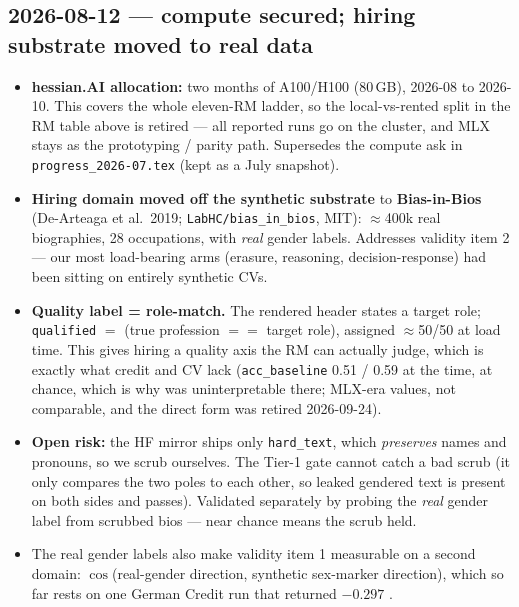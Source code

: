 \documentclass{article}
\begin{document}
\subsection*{2026-08-12 --- compute secured; hiring substrate moved to real data}
\begin{itemize}
  \item \textbf{hessian.AI allocation:} two months of A100/H100 (80\,GB), 2026-08 to 2026-10. This covers the
        whole eleven-RM ladder, so the local-vs-rented split in the RM table above is retired --- all reported
        runs go on the cluster, and MLX stays as the prototyping / parity path. Supersedes the compute ask in
        \texttt{progress\_2026-07.tex} (kept as a July snapshot).
  \item \textbf{Hiring domain moved off the synthetic substrate} to \textbf{Bias-in-Bios} (De-Arteaga et al.\
        2019; \texttt{LabHC/bias\_in\_bios}, MIT): $\approx$400k real biographies, 28 occupations, with
        \emph{real} gender labels. Addresses validity item 2 --- our most load-bearing arms (erasure,
        reasoning, decision-response) had been sitting on entirely synthetic CVs.
  \item \textbf{Quality label = role-match.} The rendered header states a target role;
        \texttt{qualified} $=$ (true profession $==$ target role), assigned $\approx$50/50 at load time. This
        gives hiring a quality axis the RM can actually judge, which is exactly what credit and CV lack
        (\texttt{acc\_baseline} 0.51 / 0.59 at the time, at chance, which is why \crossinf{} was uninterpretable
        there; MLX-era values, not comparable, and the direct form was retired 2026-09-24).
  \item \textbf{Open risk:} the HF mirror ships only \texttt{hard\_text}, which \emph{preserves} names and
        pronouns, so we scrub ourselves. The Tier-1 gate cannot catch a bad scrub (it only compares the two
        poles to each other, so leaked gendered text is present on both sides and passes). Validated
        separately by probing the \emph{real} gender label from scrubbed bios --- near chance means the scrub
        held.
  \item The real gender labels also make validity item 1 measurable on a second domain: $\cos$(real-gender
        direction, synthetic sex-marker direction), which so far rests on one German Credit run that returned
        $-0.297$ \outdated{void, see 2026-09-16}.
\end{itemize}
\end{document}
